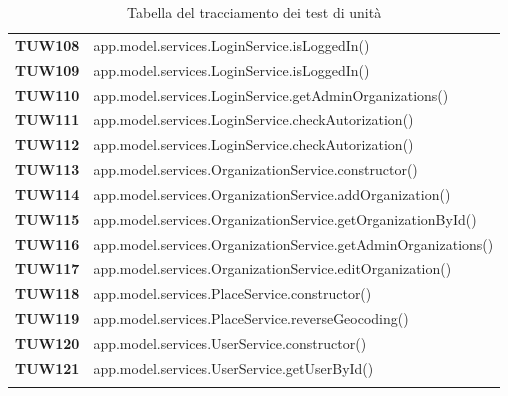 \documentclass[../../piano-di-qualifica.tex]{subfiles}
\begin{document}
\begin{longtable}[H]{>{\centering\bfseries}m{3cm} >{}m{13cm}}
TUW108             & app.model.services.LoginService.isLoggedIn\@()\\

TUW109             & app.model.services.LoginService.isLoggedIn\@()\\

TUW110            & app.model.services.LoginService.getAdminOrganizations\@()\\

TUW111             & app.model.services.LoginService.checkAutorization\@()\\

TUW112             & app.model.services.LoginService.checkAutorization\@()\\


TUW113             & app.model.services.OrganizationService.constructor\@()\\

TUW114             & app.model.services.OrganizationService.addOrganization\@()\\


TUW115             & app.model.services.OrganizationService.getOrganizationById\@()\\

TUW116             & app.model.services.OrganizationService.getAdminOrganizations\@()\\

TUW117            & app.model.services.OrganizationService.editOrganization\@()\\



TUW118             & app.model.services.PlaceService.constructor\@()\\

TUW119             & app.model.services.PlaceService.reverseGeocoding\@()\\


TUW120             & app.model.services.UserService.constructor\@()\\

TUW121             & app.model.services.UserService.getUserById\@()\\



  \rowcolor{white}
  \caption{Tabella del tracciamento dei test di unità}%
  \label{tab:tabella_tracciamento_test_di_unita}
\end{longtable}


\end{document}

